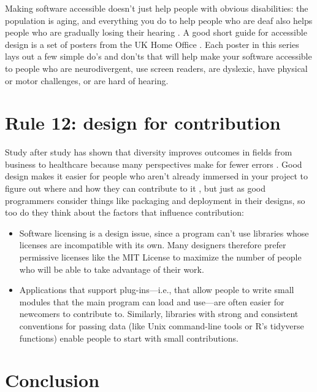 \documentclass[10pt,letterpaper]{article}
\begin{document}
Making software accessible doesn't just help people with obvious disabilities:
the population is aging,
and everything you do to help people who are deaf also helps people
who are gradually losing their hearing \cite{Johnson2017}.
A good short guide for accessible design is a set of posters from the UK Home Office \cite{UKHO}.
Each poster in this series lays out a few simple do's and don'ts that will help make your software accessible
to people who are neurodivergent,
use screen readers,
are dyslexic,
have physical or motor challenges, or are hard of hearing.

\section*{Rule 12: design for contribution}

Study after study has shown that diversity improves outcomes in fields from business to healthcare
because many perspectives make for fewer errors \cite{Gompers2018,Gomez2019}.
Good design makes it easier for people who aren't already immersed in your project
to figure out where and how they can contribute to it \cite{Sholler2019},
but just as good programmers consider things like packaging and deployment in their designs,
so too do they think about the factors that influence contribution:

\begin{itemize}

\item
  Software licensing is a design issue,
  since a program can't use libraries whose licenses are incompatible with its own.
  Many designers therefore prefer permissive licenses like the MIT License
  to maximize the number of people who will be able to take advantage of their work.

\item
  Applications that support plug-ins---i.e.,
  that allow people to write small modules that the main program can load and use---are
  often easier for newcomers to contribute to.
  Similarly,
  libraries with strong and consistent conventions for passing data
  (like Unix command-line tools or R's tidyverse functions)
  enable people to start with small contributions.

\end{itemize}

\section*{Conclusion}
\end{document}

